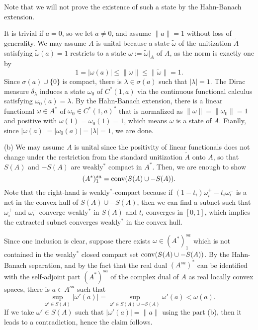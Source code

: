 \documentclass{../../large}
\begin{document}
\begin{pf}
Note that we will not prove the existence of such a state by the Hahn-Banach extension.


It is trivial if $a=0$, so we let $a\ne0$, and assume $\|a\|=1$ without loss of generality.
We may assume $A$ is unital because a state $\tilde\omega$ of the unitization $\tilde A$ satisfying $\tilde\omega(a)=1$ restricts to a state $\omega:=\tilde\omega|_A$ of $A$, as the norm is exactly one by
\[1=|\omega(a)|\le\|\omega\|\le\|\tilde\omega\|=1.\]
Since $\sigma(a)\cup\{0\}$ is compact, there is $\lambda\in\sigma(a)$ such that $|\lambda|=1$.
The Dirac measure $\delta_\lambda$ induces a state $\omega_0$ of $C^*(1,a)$ via the continuous functional calculus satisfying $\omega_0(a)=\lambda$.
By the Hahn-Banach extension, there is a linear functional $\omega\in A^*$ of $\omega_0\in C^*(1,a)^*$ that is normalized as $\|\omega\|=\|\omega_0\|=1$ and positive with $\omega(1)=\omega_0(1)=1$, which means $\omega$ is a state of $A$.
Fianlly, since $|\omega(a)|=|\omega_0(a)|=|\lambda|=1$, we are done.

(b)
We may assume $A$ is unital since the positivity of linear functionals does not change under the restriction from the standard unitization $\tilde A$ onto $A$, so that $S(A)$ and $-S(A)$ are weakly$^*$ compact in $A^*$.
Then, we are enough to show
\[(A^*)^{sa}_1=\operatorname{conv}(S(A)\cup-S(A)).\]
Note that the right-hand is weakly$^*$-compact because if $(1-t_i)\omega_i^+-t_i\omega_i^-$ is a net in the convex hull of $S(A)\cup-S(A)$, then we can find a subnet such that $\omega_i^+$ and $\omega_i^-$ converge weakly$^*$ in $S(A)$ and $t_i$ converges in $[0,1]$, which implies the extracted subnet converges weakly$^*$ in the convex hull.

Since one inclusion is clear, suppose there exists $\omega\in(A^*)^{sa}_1$ which is not contained in the weakly$^*$ closed compact set $\operatorname{conv}(S(A)\cup-S(A))$.
By the Hahn-Banach separation, and by the fact that the real dual $(A^{sa})^*$ can be identified with the self-adjoint part $(A^*)^{sa}$ of the complex dual of $A$ as real locally convex spaces, there is $a\in A^{sa}$ such that
\[\sup_{\omega'\in S(A)}|\omega'(a)|=\sup_{\omega'\in S(A)\cup-S(A)}\omega'(a)<\omega(a).\]
If we take $\omega'\in S(A)$ such that $|\omega'(a)|=\|a\|$ using the part (b), then it leads to a contradiction, hence the claim follows.
\end{pf}
\end{document}
